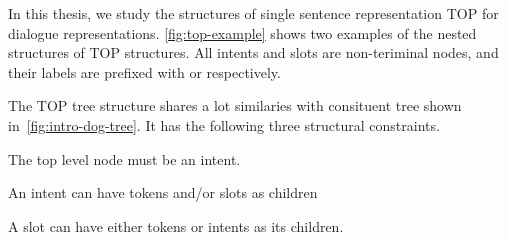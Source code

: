 In this thesis, we study the structures of single sentence
representation TOP for dialogue
representations. \autoref{fig:top-example} shows two examples of the
nested structures of TOP structures. All intents and slots are
non-teriminal nodes, and their labels are prefixed with  or
 respectively.

The TOP tree structure shares a lot similaries with consituent tree
shown in~\autoref{fig:intro-dog-tree}. It has the following three structural
constraints.
\begin{inparaenum}[(1)]
\item The top level node must be an intent.
\item An intent can have tokens and/or slots as children
\item A slot can have either tokens or intents as its children.
\end{inparaenum}

